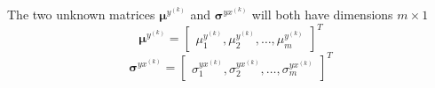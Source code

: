 
The two unknown matrices $\boldsymbol{\mu}^{y^{(k)}}$ and $\boldsymbol{\sigma}^{yx^{(k)}}$ will both have dimensions $m\times 1$
\begin{equation}
	\label{eq:v_matrix}
	\boldsymbol{\mu}^{y^{(k)}} = 
	\begin{bmatrix}
		\mu_1^{y^{(k)}}, \mu_2^{y^{(k)}}, \dotsc, \mu_m^{y^{(k)}}
	\end{bmatrix}^T
\end{equation}
\begin{equation}
	\label{gamma_matrix}
	\boldsymbol{\sigma}^{yx^{(k)}} = 
	\begin{bmatrix}
		\sigma_1^{yx^{(k)}}, \sigma_2^{yx^{(k)}}, \dotsc, \sigma_m^{yx^{(k)}}
	\end{bmatrix}^T
\end{equation}


